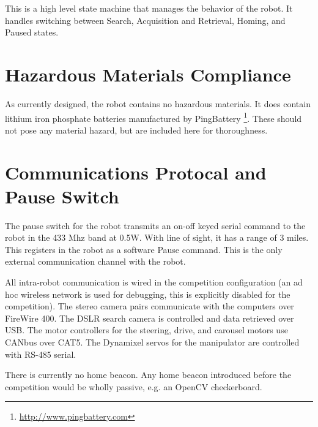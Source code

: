 \documentclass[12pt]{article}
\begin{document}
This is a high level state machine that manages the behavior of the robot. It handles switching between Search, Acquisition and Retrieval, Homing, and Paused states.


\section{Hazardous Materials Compliance}\label{Hazardous}
As currently designed, the robot contains no hazardous materials. It does contain lithium iron phosphate batteries manufactured by PingBattery \footnote{\url{http://www.pingbattery.com}}. These should not pose any material hazard, but are included here for thoroughness.

\section{Communications Protocal and Pause Switch}\label{Comms}
The pause switch for the robot transmits an on-off keyed serial command to the robot in the 433 Mhz band at 0.5W. With line of sight, it has a range of 3 miles. This registers in the robot as a software Pause command. This is the only external communication channel with the robot.

All intra-robot communication is wired in the competition configuration (an ad hoc wireless network is used for debugging, this is explicitly disabled for the competition). The stereo camera pairs communicate with the computers over FireWire 400. The DSLR search camera is controlled and data retrieved over USB. The motor controllers for the steering, drive, and carousel motors use CANbus over CAT5. The Dynamixel servos for the manipulator are controlled with RS-485 serial.

There is currently no home beacon. Any home beacon introduced before the competition would be wholly passive, e.g. an OpenCV checkerboard.



\end{document}
